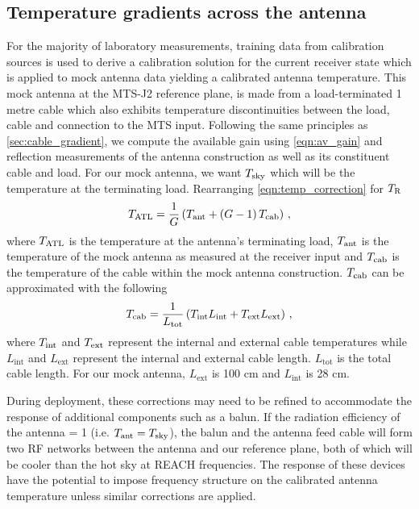 \subsection{Temperature gradients across the antenna}\label{sec:ant_corrections}
For the majority of laboratory measurements, training data from calibration sources is used to derive a calibration solution for the current receiver state which is applied to mock antenna data yielding a calibrated antenna temperature. This mock antenna at the MTS-J2 reference plane, is made from a load-terminated 1 metre cable which also exhibits temperature discontinuities between the load, cable and connection to the MTS input. Following the same principles as \cref{sec:cable_gradient}, we compute the available gain using \cref{eqn:av_gain} and reflection measurements of the antenna construction as well as its constituent cable and load. For our mock antenna, we want $T_{\mathrm{sky}}$ which will be the temperature at the terminating load. Rearranging \cref{eqn:temp_correction} for $T_{\mathrm{R}}$
\begin{equation}
    T_{\mathrm{ATL}} = \frac{1}{G} \left( T_{\mathrm{ant}} + \left( G - 1 \right) T_{\mathrm{cab}} \right) \,,
\end{equation}
where $T_{\mathrm{ATL}}$ is the temperature at the antenna’s terminating load, $T_{\mathrm{ant}}$ is the temperature of the mock antenna as measured at the receiver input and $T_{\mathrm{cab}}$ is the temperature of the cable within the mock antenna construction. $T_{\mathrm{cab}}$ can be approximated with the following
\begin{equation}
    T_{\mathrm{cab}} = \frac{1}{L_{\mathrm{tot}}} \left( T_{\mathrm{int}}L_{\mathrm{int}} + T_{\mathrm{ext}}L_{\mathrm{ext}} \right) \,,
\end{equation}
where $T_{\mathrm{int}}$ and $T_{\mathrm{ext}}$ represent the internal and external cable temperatures while $L_{\mathrm{int}}$ and $L_{\mathrm{ext}}$ represent the internal and external cable length. $L_{\mathrm{tot}}$ is the total cable length. For our mock antenna, $L_{\mathrm{ext}}$ is 100 cm and $L_{\mathrm{int}}$ is 28 cm.

During deployment, these corrections may need to be refined to accommodate the response of additional components such as a balun. If the radiation efficiency of the antenna = 1 (i.e. $T_{\mathrm{ant}}=T_{\mathrm{sky}}$), the balun and the antenna feed cable will form two RF networks between the antenna and our reference plane, both of which will be cooler than the hot sky at REACH frequencies. The response of these devices have the potential to impose frequency structure on the calibrated antenna temperature unless similar corrections are applied.

